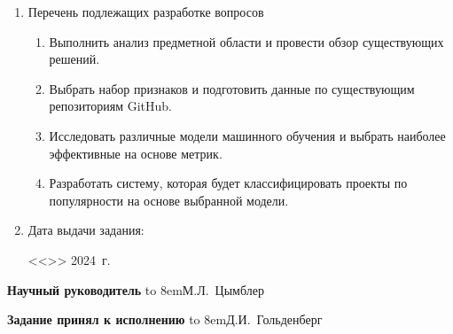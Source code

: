 \begin{adjustwidth}{-1.5cm}{0.5cm}
\begin{linespread}{1}
{\begin{enumerate}
	\bf\item Перечень подлежащих разработке вопросов\rm
	\begin{enumerate}
    \item Выполнить анализ предметной области и провести обзор существующих решений.

    \item Выбрать набор признаков и подготовить данные по существующим репозиториям GitHub.

   \item Исследовать различные модели машинного обучения и выбрать наиболее эффективные на основе метрик.

    \item Разработать систему, которая будет классифицировать проекты по популярности на основе выбранной модели.
	\end{enumerate}

    	\bf\item Дата выдачи задания: \rm

<<\underline{\qquad}>>\underfield{} 2024~г.
\end{enumerate}

\vspace{1em}

\noindent
\textbf{Научный руководитель}
\hfill
\hbox to 8em{М.Л.~Цымблер\hfill}

\vspace{1em}

\noindent
\textbf{Задание принял к исполнению}
\hfill
\hbox to 8em{Д.И.~Гольденберг\hfill}

}

\thispagestyle{empty}

\end{linespread}
\end{adjustwidth}

\pagebreak
